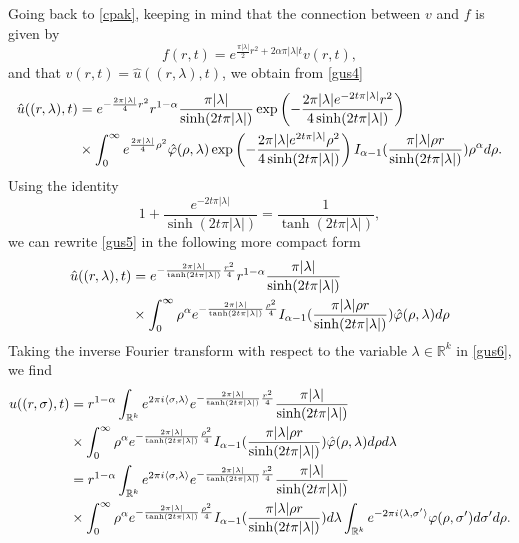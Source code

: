 \documentclass[11pt,a4paper]{amsart}
\def \R {\mathbb{R}}
\def \vf{\varphi}
\newcommand{\la}{\lambda}
\numberwithin{equation}{section}
\newcommand{\sa}{\langle}
\newcommand{\da}{\rangle}
\numberwithin{equation}{section}
\begin{document}
Going back to \eqref{cpak}, keeping in mind that the connection between $v$ and $f$ is given by 
\[
f(r,t) = e^{\frac{\pi |\la|}{2} r^2 + 2\alpha \pi |\la| t} v(r,t), 
\]
and that $v(r,t) = \hat u((r,\la),t)$,
we obtain from \eqref{gus4}
\begin{align}\label{gus5}
\hat u((r,\la),t) & =   e^{-\frac{2\pi |\la|}{4} r^2} r^{1-\alpha} \frac{\pi |\la|}{\sinh(2t \pi |\la|)}  \exp\left(- \frac{2\pi |\la| e^{-2 t \pi |\la|} r^2}{4 \sinh(2t\pi |\la|)}\right) 
\\
& \times \int_0^\infty e^{\frac{2\pi |\la|}{4} \rho^2} \hat \vf(\rho,\la) \exp\left(- \frac{2\pi |\la| e^{2t\pi |\la|} \rho^2}{4 \sinh(2t\pi |\la|)}\right) I_{\alpha - 1}(\frac{\pi |\la| \rho r}{\sinh(2t\pi |\la|)}) 
  \rho^{\alpha} d\rho.
\notag
\end{align}
Using the identity
\[
1+ \frac{e^{-2t\pi |\la|}}{\sinh(2t\pi |\la|)} = \frac{1}{\tanh(2t\pi |\la|)},
\]
we can rewrite \eqref{gus5} in the following more compact form
\begin{align}\label{gus6}
\hat u((r,\la),t) & =   e^{-\frac{2\pi |\la|}{\tanh(2t \pi |\la|)} \frac{r^2}4} r^{1-\alpha} \frac{\pi |\la|}{\sinh(2t \pi |\la|)}   
\\
& \times \int_0^\infty \rho^{\alpha} e^{-\frac{2\pi |\la|}{\tanh(2t \pi |\la|)} \frac{\rho^2}4} I_{\alpha - 1}(\frac{\pi |\la| \rho r}{\sinh(2t\pi |\la|)})  \hat \vf(\rho,\la) d\rho
\notag\end{align}
Taking the inverse Fourier transform with respect to the variable $\la\in \R^k$ in \eqref{gus6}, we find
\begin{align}\label{gus7}
u((r,\sigma),t) & = r^{1-\alpha} \int_{\R^k} e^{2\pi i\sa \sigma,\la\da} e^{-\frac{2\pi |\la|}{\tanh(2t \pi |\la|)} \frac{r^2}4}  \frac{\pi |\la|}{\sinh(2t \pi |\la|)}  
\\
& \times \int_0^\infty \rho^{\alpha} e^{-\frac{2\pi |\la|}{\tanh(2t \pi |\la|)} \frac{\rho^2}4}I_{\alpha - 1}(\frac{\pi |\la|\rho r}{\sinh(2t\pi |\la|)}) 
 \hat \vf(\rho,\la)  d\rho d\la
\notag\\
& = r^{1-\alpha} \int_{\R^k} e^{2\pi i\sa \sigma,\la\da} e^{-\frac{2\pi |\la|}{\tanh(2t \pi |\la|)} \frac{r^2}4}  \frac{ \pi |\la|}{\sinh(2t \pi |\la|)}  
\notag
\\
& \times \int_0^\infty \rho^{\alpha} e^{-\frac{2\pi |\la|}{\tanh(2t \pi |\la|)} \frac{\rho^2}4} I_{\alpha - 1}(\frac{\pi |\la| \rho r}{\sinh(2t\pi |\la|)}) d\la\int_{\R^k} e^{-2\pi i\sa\la,\sigma'\da} \vf(\rho,\sigma') d\sigma' d\rho.
\notag
\end{align}
\end{document}
